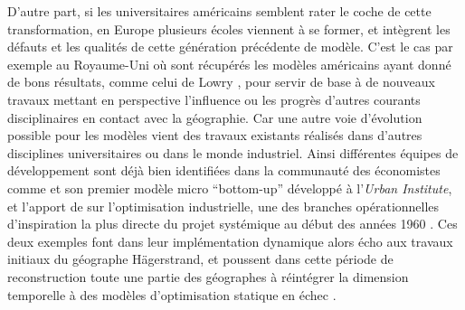 D'autre part, si les universitaires américains semblent rater le coche de cette transformation, en Europe plusieurs écoles viennent à se former, et intègrent les défauts et les qualités de cette génération précédente de modèle. C'est le cas par exemple au Royaume-Uni où sont récupérés les modèles américains ayant donné de bons résultats, comme celui de Lowry \autocite{Lowry1964}, pour servir de base à de nouveaux travaux mettant en perspective l'influence ou les progrès d'autres courants disciplinaires en contact avec la géographie. Car une autre voie d'évolution possible pour les modèles vient des travaux existants réalisés dans d'autres disciplines universitaires ou dans le monde industriel. Ainsi différentes équipes de développement sont déjà bien identifiées dans la communauté des économistes comme \textcite{Orcutt1957} et son premier modèle micro \foreignquote{english}{bottom-up} développé à l'\textit{Urban Institute}, et l'apport de \textcite{Forrester1961,Forrester1969} sur l'optimisation industrielle, une des branches opérationnelles d'inspiration la plus directe du projet systémique au début des années 1960 \autocites{Cohen1961}[911]{Shubik1960b}. Ces deux exemples font dans leur implémentation dynamique alors écho aux travaux initiaux du géographe Hägerstrand, et poussent dans cette période de reconstruction toute une partie des géographes à réintégrer la dimension temporelle à des modèles d'optimisation statique en échec \autocite[p295]{Batty1976}.


